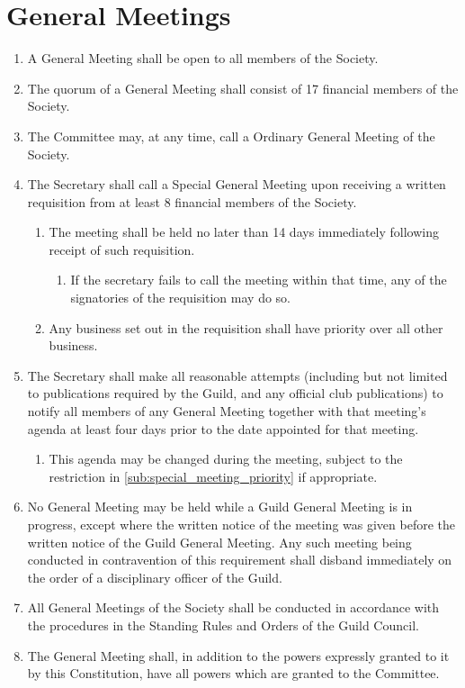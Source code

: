 \documentclass[a4paper]{article}
\newenvironment{enumsection}[1]{\section{#1} \begin{enumerate}[ref=\thesection.\theenumi]}{\end{enumerate}}
\begin{document}
\begin{enumsection}{General Meetings} \label{sec:general_meetings}
    \item A General Meeting shall be open to all members of the Society.
    \item The quorum of a General Meeting shall consist of 17 financial members of the Society.
    \item The Committee may, at any time, call a Ordinary General Meeting of the Society.
    \item The Secretary shall call a Special General Meeting upon receiving a written requisition from at least 8 financial members of the Society.
    \begin{enumerate}
        \item The meeting shall be held no later than 14 days immediately following receipt of such requisition. 
        \begin{enumerate}
            \item If the secretary fails to call the meeting within that time, any of the signatories of the requisition may do so.
        \end{enumerate}
        \item \label{sub:special_meeting_priority} Any business set out in the requisition shall have priority over all other business. 
    \end{enumerate}
    \item The Secretary shall make all reasonable attempts (including but not limited to publications required by the Guild, and any official club publications) to notify all members of any General Meeting together with that meeting's agenda at least four days prior to the date appointed for that meeting.
    \begin{enumerate}
        \item This agenda may be changed during the meeting, subject to the restriction in \cref{sub:special_meeting_priority} if appropriate.
    \end{enumerate}
    \item No General Meeting may be held while a Guild General Meeting is in progress, except where the written notice of the meeting was given before the written notice of the Guild General Meeting. Any such meeting being conducted in contravention of this requirement shall disband immediately on the order of a disciplinary officer of the Guild.
    \item All General Meetings of the Society shall be conducted in accordance with the procedures in the Standing Rules and Orders of the Guild Council.
    \item The General Meeting shall, in addition to the powers expressly granted to it by this Constitution, have all powers which are granted to the Committee.
\end{enumsection}
\end{document}
